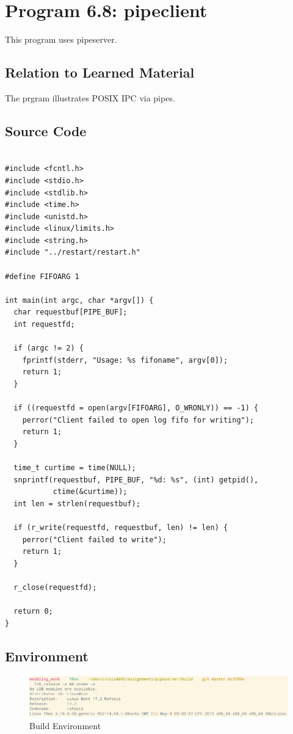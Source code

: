 \documentclass[letter,12pt,sffamily]{article}
\begin{document}
\section{Program 6.8: pipeclient}
This program uses pipeserver.
\subsection{Relation to Learned Material}
The prgram illustrates POSIX IPC via pipes.
\subsection{Source Code}
\renewcommand{\theFancyVerbLine}{
	\sffamily\textcolor[rgb]{0.5,0.5,0.5}{\scriptsize\arabic{FancyVerbLine}}}

\begin{verbatim}
	
#include <fcntl.h>
#include <stdio.h>
#include <stdlib.h>
#include <time.h>
#include <unistd.h>
#include <linux/limits.h>
#include <string.h>
#include "../restart/restart.h"

#define FIFOARG 1

int main(int argc, char *argv[]) {
  char requestbuf[PIPE_BUF];
  int requestfd;
	
  if (argc != 2) {
    fprintf(stderr, "Usage: %s fifoname", argv[0]);
    return 1;
  }
	
  if ((requestfd = open(argv[FIFOARG], O_WRONLY)) == -1) {
    perror("Client failed to open log fifo for writing");
    return 1;
  }
	
  time_t curtime = time(NULL);
  snprintf(requestbuf, PIPE_BUF, "%d: %s", (int) getpid(), 
           ctime(&curtime));
  int len = strlen(requestbuf);
	
  if (r_write(requestfd, requestbuf, len) != len) {
    perror("Client failed to write");
    return 1;
  }
	
  r_close(requestfd);
	
  return 0;
}
\end{verbatim}
\subsection{Environment}
\begin{figure}[H]
	\centering
	\includegraphics[width=1\linewidth]{./images/0}
	\caption[env]{Build Environment}
	\label{fig:13}
\end{figure}
\end{document}
